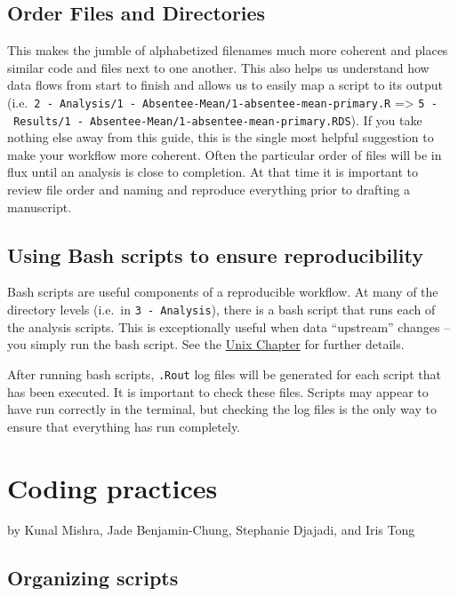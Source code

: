 \documentclass[
]{book}
\begin{document}
\section{Order Files and Directories}\label{order-files-and-directories}

This makes the jumble of alphabetized filenames much more coherent and places similar code and files next to one another. This also helps us understand how data flows from start to finish and allows us to easily map a script to its output (i.e.~\texttt{2\ -\ Analysis/1\ -\ Absentee-Mean/1-absentee-mean-primary.R} =\textgreater{} \texttt{5\ -\ Results/1\ -\ Absentee-Mean/1-absentee-mean-primary.RDS}). If you take nothing else away from this guide, this is the single most helpful suggestion to make your workflow more coherent. Often the particular order of files will be in flux until an analysis is close to completion. At that time it is important to review file order and naming and reproduce everything prior to drafting a manuscript.

\section{Using Bash scripts to ensure reproducibility}\label{using-bash-scripts-to-ensure-reproducibility}

Bash scripts are useful components of a reproducible workflow. At many of the directory levels (i.e.~in \texttt{3\ -\ Analysis}), there is a bash script that runs each of the analysis scripts. This is exceptionally useful when data ``upstream'' changes -- you simply run the bash script. See the \hyperref[unix]{Unix Chapter} for further details.

After running bash scripts, \texttt{.Rout} log files will be generated for each script that has been executed. It is important to check these files. Scripts may appear to have run correctly in the terminal, but checking the log files is the only way to ensure that everything has run completely.

\chapter{Coding practices}\label{coding-practices}

by Kunal Mishra, Jade Benjamin-Chung, Stephanie Djajadi, and Iris Tong

\section{Organizing scripts}\label{organizing-scripts}
\end{document}
